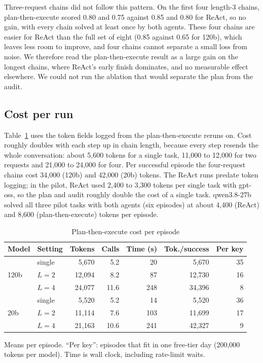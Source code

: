 \documentclass[10pt,a4paper,twocolumn]{article}
\begin{document}
Three-request chains did not follow this pattern. On the first four length-3 chains, plan-then-execute scored 0.80 and
0.75 against 0.85 and 0.80 for ReAct, so no gain, with every chain solved at least once by both agents. These four
chains are easier for ReAct than the full set of eight (0.85 against 0.65 for 120b), which leaves less room to improve,
and four chains cannot separate a small loss from noise. We therefore read the plan-then-execute result as a large gain
on the longest chains, where ReAct's early finish dominates, and no measurable effect elsewhere. We could not run the
ablation that would separate the plan from the audit.

\subsection{Cost per run}
Table~\ref{tab:cost} uses the token fields logged from the plan-then-execute reruns on. Cost roughly doubles with each
step up in chain length, because every step resends the whole conversation: about 5,600 tokens for a single task, 11,000
to 12,000 for two requests and 21,000 to 24,000 for four. Per successful episode the four-request chains cost 34,000
(120b) and 42,000 (20b) tokens. The ReAct runs predate token logging; in the pilot, ReAct used 2,400 to 3,300 tokens per
single task with gpt-oss, so the plan and audit roughly double the cost of a single task. qwen3.8-27b solved all three
pilot tasks with both agents (six episodes) at about 4,400 (ReAct) and 8,600 (plan-then-execute) tokens per episode.

\begin{table}[t]
\caption{Plan-then-execute cost per episode}\label{tab:cost}
\centering\small
\setlength{\tabcolsep}{3.5pt}
\begin{tabular}{@{}llrrrrr@{}}
\toprule
Model & Setting & Tokens & Calls & Time (s) & Tok./success & Per key\\
\midrule
\multirow{3}{*}{120b} & single & 5,670 & 5.2 & 20 & 5,670 & 35\\
 & $L=2$ & 12,094 & 8.2 & 87 & 12,730 & 16\\
 & $L=4$ & 24,077 & 11.6 & 248 & 34,396 & 8\\
\midrule
\multirow{3}{*}{20b} & single & 5,520 & 5.2 & 14 & 5,520 & 36\\
 & $L=2$ & 11,114 & 7.6 & 103 & 11,699 & 17\\
 & $L=4$ & 21,163 & 10.6 & 241 & 42,327 & 9\\
\bottomrule
\end{tabular}

\smallskip
\footnotesize Means per episode. ``Per key'': episodes that fit in one free-tier day (200,000 tokens per model). Time is
wall clock, including rate-limit waits.
\end{table}
\end{document}
